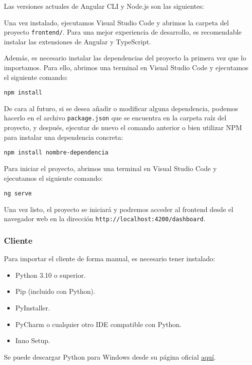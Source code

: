 Las versiones actuales de Angular CLI y Node.js son las siguientes:


Una vez instalado, ejecutamos Visual Studio Code y abrimos la carpeta del proyecto \texttt{frontend/}.
Para una mejor experiencia de desarrollo, es recomendable instalar las extensiones de Angular y TypeScript.

Además, es necesario instalar las dependencias del proyecto la primera vez que lo importamos.
Para ello, abrimos una terminal en Visual Studio Code y ejecutamos el siguiente comando:
\begin{verbatim}
npm install
\end{verbatim}

De cara al futuro, si se desea añadir o modificar alguna dependencia, podemos hacerlo en el archivo
\texttt{package.json} que se encuentra en la carpeta raíz del proyecto, y después, ejecutar de nuevo el comando anterior
o bien utilizar NPM para instalar una dependencia concreta:
\begin{verbatim}
npm install nombre-dependencia
\end{verbatim}

Para iniciar el proyecto, abrimos una terminal en Visual Studio Code y ejecutamos el siguiente comando:
\begin{verbatim}
ng serve
\end{verbatim}

Una vez listo, el proyecto se iniciará y podremos acceder al frontend desde el navegador web en la dirección
\texttt{http://localhost:4200/dashboard}.

\subsubsection{Cliente}

Para importar el cliente de forma manual, es necesario tener instalado:
\begin{itemize}
    \tightlist
    \item Python 3.10 o superior.
    \item Pip (incluido con Python).
    \item PyInstaller.
    \item PyCharm o cualquier otro IDE compatible con Python.
    \item Inno Setup.
\end{itemize}

Se puede descargar Python para Windows desde su página oficial \href{https://www.python.org/downloads/windows/}{aquí}.

